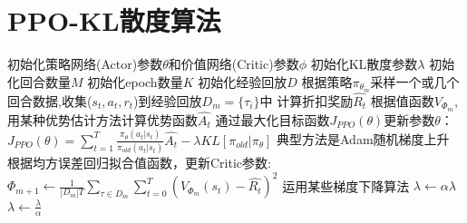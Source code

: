 \documentclass[11pt]{ctexart}
\begin{document}
\clearpage

\section{PPO-KL散度算法}
\begin{algorithm}[H] %
	\renewcommand{\thealgorithm}{} %
	\caption{} 
	\begin{algorithmic}[1] %
		\STATE 初始化策略网络(Actor)参数$\theta$和价值网络(Critic)参数$\phi$
		\STATE 初始化KL散度参数$\lambda$
		\STATE 初始化回合数量$M$
		\STATE 初始化epoch数量$K$
		\STATE 初始化经验回放$D$
			\STATE 根据策略$\pi_{\theta_m}$采样一个或几个回合数据,收集($s_t,a_t,r_t$)到经验回放$D_m=\{\tau_i\}$中
				\STATE 计算折扣奖励$\hat{R_t}$
				\STATE 根据值函数$V_{\Phi_m}$,用某种优势估计方法计算优势函数$\hat{A_t}$
				\STATE 通过最大化目标函数$J_{PPO}(\theta)$更新参数$\theta$：
				\STATE $J_{PPO}(\theta)=\sum_{t=1}^{T}\frac{\pi_\theta(a_t|s_t)}{\pi_{old}(a_t|s_t)}\hat{A_t}-\lambda KL[\pi_{old}|\pi_\theta]$
				\STATE 典型方法是Adam随机梯度上升
				\STATE 根据均方误差回归拟合值函数，更新Critic参数:
				\STATE $\Phi_{m+1} \leftarrow \frac{1}{|D_m|T}\sum_{\tau \in D_m}\sum_{t=0}^{T} (V_{\Phi_{m}}(s_t)-\hat{R_t})^2$
				\STATE 运用某些梯度下降算法
					\STATE $\lambda \leftarrow \alpha\lambda$
					\STATE $\lambda \leftarrow \frac{\lambda}{\alpha}$
				\ENDIF
			\ENDFOR
		\ENDFOR
	\end{algorithmic}
\end{algorithm}

\clearpage
\end{document}
